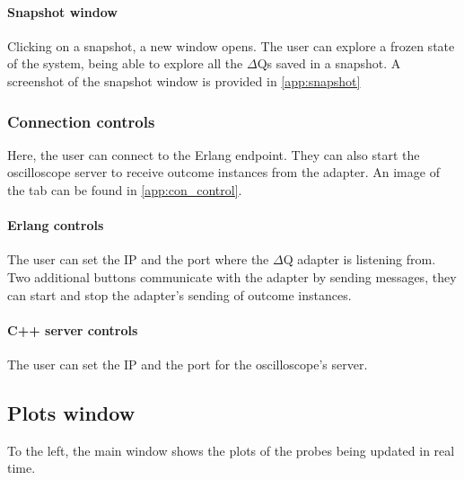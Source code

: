     \paragraph{Snapshot window}
        Clicking on a snapshot, a new window opens. The user can explore a frozen state of the system, being able to explore all the $\Delta$Qs saved in a snapshot. A screenshot of the snapshot window is provided in \cref{app:snapshot}
   \subsubsection{Connection controls}
    
        Here, the user can connect to the Erlang endpoint. They can also start the oscilloscope server to receive outcome instances from the adapter. An image of the tab can be found in \ref{app:con_control}.

        \paragraph{Erlang controls}
            The user can set the IP and the port where the $\Delta$Q adapter is listening from. Two additional buttons communicate with the adapter by sending messages, they can start and stop the adapter's sending of outcome instances.
        
        \paragraph{C++ server controls}
            The user can set the IP and the port for the oscilloscope's server.

\subsection{Plots window}
        To the left, the main window shows the plots of the probes being updated in real time. 

